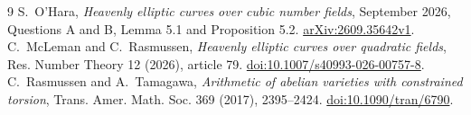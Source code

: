 \documentclass[11pt]{article}
\begin{document}
\begin{thebibliography}{9}
 S.~O'Hara, \emph{Heavenly elliptic curves over cubic number
fields}, September 2026, Questions A and B, Lemma 5.1 and Proposition 5.2.
\href{https://arxiv.org/abs/2609.35642v1}{arXiv:2609.35642v1}.
 C.~McLeman and C.~Rasmussen, \emph{Heavenly elliptic curves over
quadratic fields}, Res. Number Theory 12 (2026), article 79.
\href{https://doi.org/10.1007/s40993-026-00757-8}{doi:10.1007/s40993-026-00757-8}.
 C.~Rasmussen and A.~Tamagawa, \emph{Arithmetic of abelian
varieties with constrained torsion}, Trans. Amer. Math. Soc. 369 (2017),
2395--2424. \href{https://doi.org/10.1090/tran/6790}{doi:10.1090/tran/6790}.
\end{thebibliography}
\end{document}
